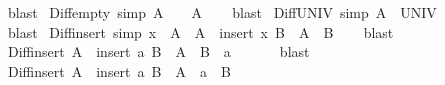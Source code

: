 \begin{isabellebody}
%
\isatagproof
{}\isamarkupfalse%
\ blast%
\endisatagproof
{\isafoldproof}%
%
\isadelimproof
\isanewline
%
\endisadelimproof
\isanewline
{}\isamarkupfalse%
\ Diff{\isacharunderscore}{\kern0pt}empty\ {\isacharbrackleft}{\kern0pt}simp{\isacharbrackright}{\kern0pt}{\isacharcolon}{\kern0pt}\ {\isachardoublequoteopen}A\ {\isacharminus}{\kern0pt}\ {\isacharbraceleft}{\kern0pt}{\isacharbraceright}{\kern0pt}\ {\isacharequal}{\kern0pt}\ A{\isachardoublequoteclose}\isanewline
%
\isadelimproof
\ \ %
\endisadelimproof
%
\isatagproof
{}\isamarkupfalse%
\ blast%
\endisatagproof
{\isafoldproof}%
%
\isadelimproof
\isanewline
%
\endisadelimproof
\isanewline
{}\isamarkupfalse%
\ Diff{\isacharunderscore}{\kern0pt}UNIV\ {\isacharbrackleft}{\kern0pt}simp{\isacharbrackright}{\kern0pt}{\isacharcolon}{\kern0pt}\ {\isachardoublequoteopen}A\ {\isacharminus}{\kern0pt}\ UNIV\ {\isacharequal}{\kern0pt}\ {\isacharbraceleft}{\kern0pt}{\isacharbraceright}{\kern0pt}{\isachardoublequoteclose}\isanewline
%
\isadelimproof
\ \ %
\endisadelimproof
%
\isatagproof
{}\isamarkupfalse%
\ blast%
\endisatagproof
{\isafoldproof}%
%
\isadelimproof
\isanewline
%
\endisadelimproof
\isanewline
{}\isamarkupfalse%
\ Diff{\isacharunderscore}{\kern0pt}insert{}\ {\isacharbrackleft}{\kern0pt}simp{\isacharbrackright}{\kern0pt}{\isacharcolon}{\kern0pt}\ {\isachardoublequoteopen}x\ {\isasymnotin}\ A\ {\isasymLongrightarrow}\ A\ {\isacharminus}{\kern0pt}\ insert\ x\ B\ {\isacharequal}{\kern0pt}\ A\ {\isacharminus}{\kern0pt}\ B{\isachardoublequoteclose}\isanewline
%
\isadelimproof
\ \ %
\endisadelimproof
%
\isatagproof
{}\isamarkupfalse%
\ blast%
\endisatagproof
{\isafoldproof}%
%
\isadelimproof
\isanewline
%
\endisadelimproof
\isanewline
{}\isamarkupfalse%
\ Diff{\isacharunderscore}{\kern0pt}insert{\isacharcolon}{\kern0pt}\ {\isachardoublequoteopen}A\ {\isacharminus}{\kern0pt}\ insert\ a\ B\ {\isacharequal}{\kern0pt}\ A\ {\isacharminus}{\kern0pt}\ B\ {\isacharminus}{\kern0pt}\ {\isacharbraceleft}{\kern0pt}a{\isacharbraceright}{\kern0pt}{\isachardoublequoteclose}\isanewline
\ \ %
\isanewline
%
\isadelimproof
\ \ %
\endisadelimproof
%
\isatagproof
{}\isamarkupfalse%
\ blast%
\endisatagproof
{\isafoldproof}%
%
\isadelimproof
\isanewline
%
\endisadelimproof
\isanewline
{}\isamarkupfalse%
\ Diff{\isacharunderscore}{\kern0pt}insert{}{\isacharcolon}{\kern0pt}\ {\isachardoublequoteopen}A\ {\isacharminus}{\kern0pt}\ insert\ a\ B\ {\isacharequal}{\kern0pt}\ A\ {\isacharminus}{\kern0pt}\ {\isacharbraceleft}{\kern0pt}a{\isacharbraceright}{\kern0pt}\ {\isacharminus}{\kern0pt}\ B{\isachardoublequoteclose}\isanewline

\end{isabellebody}
